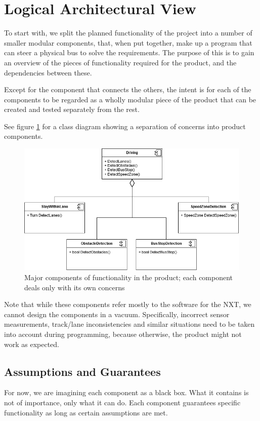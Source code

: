 \section{Logical Architectural View}

To start with, we split the planned functionality of the project into a number of smaller modular components, that, when put together, make up a program that can steer a physical bus to solve the requirements. The purpose of this is to gain an overview of the pieces of functionality required for the product, and the dependencies between these. 

Except for the component that connects the others, the intent is for each of the components to be regarded as a wholly modular piece of the product that can be created and tested separately from the rest. 

See figure \ref{fig:components} for a class diagram showing a separation of concerns into product components. 

\begin{figure}[ht]
    \includegraphics[width=\textwidth]{Images/Design/componentDiagram.png}
    \caption{Major components of functionality in the product; each component deals only with its own concerns}
    \label{fig:components}
\end{figure}




Note that while these components refer mostly to the software for the NXT, we cannot design the components in a vacuum. Specifically, incorrect sensor measurements, track/lane inconsistencies and similar situations need to be taken into account during programming, because otherwise, the product might not work as expected. 

\subsection{Assumptions and Guarantees}
For now, we are imagining each component as a black box. What it contains is not of importance, only what it can do. Each component guarantees specific functionality as long as certain assumptions are met.


